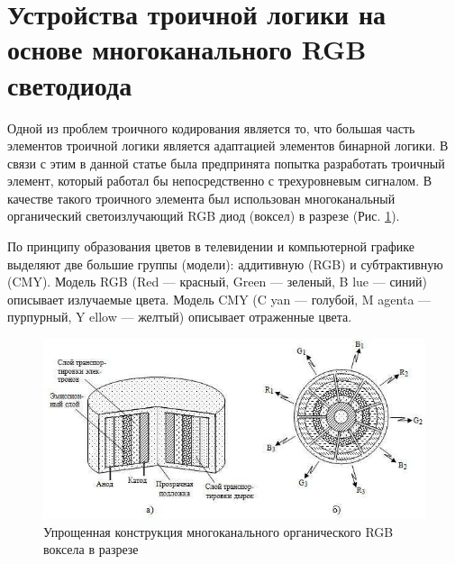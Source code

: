 \documentclass[10pt]{beamer}
\begin{document}
\section{Устройства троичной логики на основе многоканального RGB светодиода}
\begin{frame}[shrink=20,fragile]
\transdissolve[duration=0.2]
	Одной из проблем троичного кодирования является то, что большая часть элементов троичной логики является адаптацией элементов бинарной логики. В связи с этим в данной статье была предпринята попытка разработать троичный элемент, который работал бы непосредственно с трехуровневым сигналом. В качестве такого троичного элемента был использован многоканальный органический светоизлучающий RGB диод (воксел) в разрезе (Рис. \ref{fig2}).
	
	По принципу образования цветов в телевидении и компьютерной графике выделяют две большие группы (модели): аддитивную (RGB) и субтрактивную (CMY).
Модель RGB (Red — красный, Green — зеленый, B lue — синий) описывает излучаемые цвета. Модель CMY (C yan — голубой, M agenta — пурпурный, Y ellow — желтый) описывает отраженные цвета.
\begin{block}{}
	\begin{figure}
	\label{fig2}
	\includegraphics[scale=0.85]{pics/2.jpeg}
	\caption{Упрощенная конструкция многоканального органического RGB воксела в разрезе}
	\end{figure}
\end{block}   

\end{frame}
\end{document}
